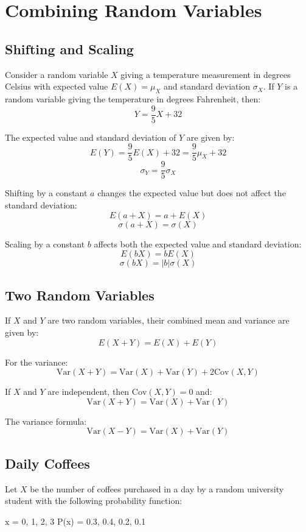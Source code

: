 \documentclass{article}
\begin{document}
\section*{Combining Random Variables}

\subsection*{Shifting and Scaling}

Consider a random variable \(X\) giving a temperature measurement in degrees Celsius with expected value \(E(X) = \mu_X\) and standard deviation \(\sigma_X\). If \(Y\) is a random variable giving the temperature in degrees Fahrenheit, then:
\[
Y = \frac{9}{5} X + 32
\]

The expected value and standard deviation of \(Y\) are given by:
\[
E(Y) = \frac{9}{5} E(X) + 32 = \frac{9}{5} \mu_X + 32
\]
\[
\sigma_Y = \frac{9}{5} \sigma_X
\]

Shifting by a constant \(a\) changes the expected value but does not affect the standard deviation:
\[
E(a + X) = a + E(X)
\]
\[
\sigma(a + X) = \sigma(X)
\]

Scaling by a constant \(b\) affects both the expected value and standard deviation:
\[
E(bX) = b E(X)
\]
\[
\sigma(bX) = |b| \sigma(X)
\]

\subsection*{Two Random Variables}

If \(X\) and \(Y\) are two random variables, their combined mean and variance are given by:
\[
E(X + Y) = E(X) + E(Y)
\]

For the variance:
\[
\text{Var}(X + Y) = \text{Var}(X) + \text{Var}(Y) + 2 \text{Cov}(X, Y)
\]

If \(X\) and \(Y\) are independent, then \(\text{Cov}(X, Y) = 0\) and:
\[
\text{Var}(X + Y) = \text{Var}(X) + \text{Var}(Y)
\]

The variance formula:
\[
\text{Var}(X - Y) = \text{Var}(X) + \text{Var}(Y)
\]

\subsection*{Daily Coffees}

Let \(X\) be the number of coffees purchased in a day by a random university student with the following probability function:

x = 0, 1, 2, 3
P(x) = 0.3, 0.4, 0.2, 0.1
\end{document}
